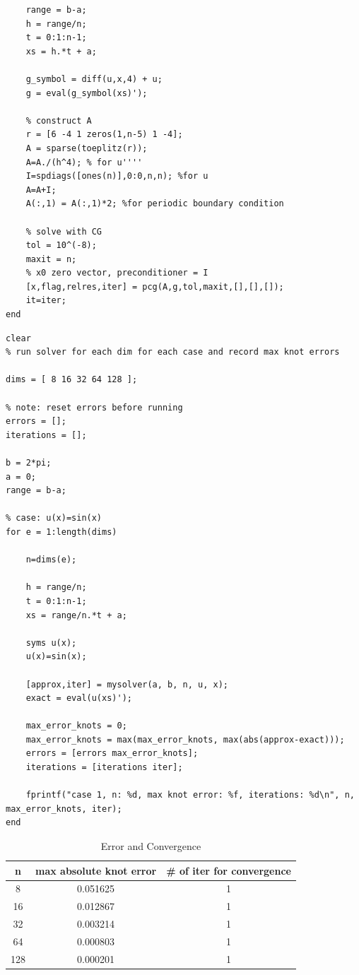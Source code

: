 \documentclass[12pt,letter]{article}
\begin{document}
\begin{enumerate}
\begin{enumerate}
\begin{verbatim}
    range = b-a;
    h = range/n;
    t = 0:1:n-1;
    xs = h.*t + a;
    
    g_symbol = diff(u,x,4) + u;
    g = eval(g_symbol(xs)');
    
    % construct A
    r = [6 -4 1 zeros(1,n-5) 1 -4];
    A = sparse(toeplitz(r));
    A=A./(h^4); % for u''''
    I=spdiags([ones(n)],0:0,n,n); %for u
    A=A+I;
    A(:,1) = A(:,1)*2; %for periodic boundary condition
    
    % solve with CG
    tol = 10^(-8);
    maxit = n;
    % x0 zero vector, preconditioner = I
    [x,flag,relres,iter] = pcg(A,g,tol,maxit,[],[],[]);
    it=iter;
end
\end{verbatim}
    
    \pagebreak
    
\begin{verbatim}
clear
% run solver for each dim for each case and record max knot errors

dims = [ 8 16 32 64 128 ];

% note: reset errors before running
errors = [];
iterations = [];

b = 2*pi;
a = 0;
range = b-a;

% case: u(x)=sin(x)
for e = 1:length(dims)

    n=dims(e);
    
    h = range/n;
    t = 0:1:n-1;
    xs = range/n.*t + a;
    
    syms u(x);
    u(x)=sin(x);

    [approx,iter] = mysolver(a, b, n, u, x);
    exact = eval(u(xs)');

    max_error_knots = 0;
    max_error_knots = max(max_error_knots, max(abs(approx-exact)));
    errors = [errors max_error_knots];
    iterations = [iterations iter];
    
    fprintf("case 1, n: %d, max knot error: %f, iterations: %d\n", n, max_error_knots, iter);
end
\end{verbatim}
    
    \pagebreak
    \begin{table}[h]
      \begin{center}
        \begin{tabular}{ | c | c | c |}
          \hline
          n & max absolute knot error & \# of iter for convergence\\
          \hline
          8 & 0.051625 & 1\\
          \hline
          16 & 0.012867 & 1\\
          \hline
          32 & 0.003214 & 1\\
          \hline
          64 & 0.000803 & 1\\
          \hline
          128 & 0.000201 & 1\\
          \hline
        \end{tabular}
        \caption{Error and Convergence}
      \end{center}
    \end{table}


\end{enumerate}
\end{enumerate}
\end{document}
